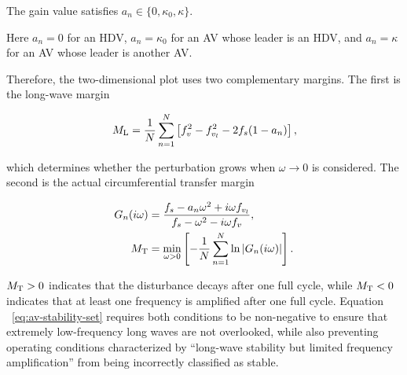\documentclass[11pt,a4paper,openany]{book}
\numberwithin{equation}{chapter}
\numberwithin{figure}{chapter}
\numberwithin{table}{chapter}
\begin{document}
The gain value satisfies $a_n\in\{0,\kappa_0,\kappa\}$.
\label{eq:av-pair-gain}

Here $a_n=0$ for an HDV, $a_n=\kappa_0$ for an AV whose leader is an HDV, and $a_n=\kappa$ for an AV whose leader is another AV.


Therefore, the two-dimensional plot uses two complementary margins. The first is the long-wave margin

\begin{equation}
M_{\rm L}
=\frac1N\sum_{n=1}^{N}
\left[f_v^2-f_{v_l}^2-2f_s(1-a_n)\right],
\label{eq:av-long-margin}
\end{equation}

which determines whether the perturbation grows when $\omega\to0$ is considered. The second is the actual circumferential transfer margin

\begin{align}
G_n(i\omega)
&=\frac{f_s-a_n\omega^2+i\omega f_{v_l}}
{f_s-\omega^2-i\omega f_v},\\
M_{\rm T}
&=\min_{\omega>0}
\left[-\frac1N\sum_{n=1}^{N}\ln|G_n(i\omega)|\right].
\label{eq:av-transfer-margin}
\end{align}

$M_{\rm T}>0$ indicates that the disturbance decays after one full cycle, while $M_{\rm T}<0$ indicates that at least one frequency is amplified after one full cycle. Equation ~\eqref{eq:av-stability-set} requires both conditions to be non-negative to ensure that extremely low-frequency long waves are not overlooked, while also preventing operating conditions characterized by “long-wave stability but limited frequency amplification” from being incorrectly classified as stable.
\end{document}

